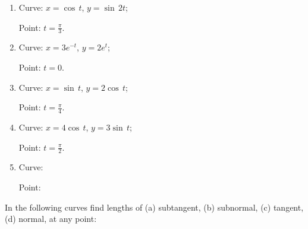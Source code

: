 \begin{enumerate}
\item
Curve:
$x = \cos\, t$, $y = \sin\, 2t$; 

Point:
$t = \frac{\pi}{3}$.

\item
Curve:
$x = 3e^{-t}$, $y = 2e^t$;

Point:
$t = 0$.

\item
Curve:
$x = \sin\, t$, $y = 2 \cos\, t$; 

Point:
$t = \frac{\pi}{4}$.

\item
Curve:
$x = 4 \cos\, t$, $y = 3 \sin\, t$; 

Point:
$t = \frac{\pi}{2}$.

\item
Curve:

Point:

\end{enumerate}

In the following curves find lengths of 
(a) subtangent, (b) subnormal, (c) tangent, (d) normal, at any point:

